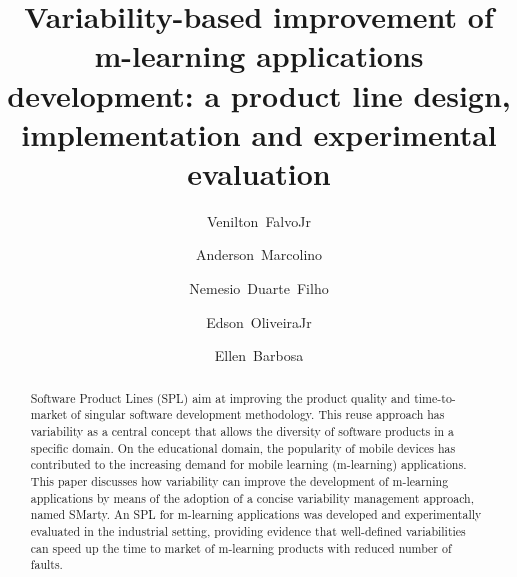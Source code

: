 \documentclass[preprint,12pt]{elsarticle}
\begin{document}
\begin{frontmatter}



\title{Variability-based improvement of m-learning applications development: a product line design, implementation and experimental evaluation}


\author[usp]{Venilton~FalvoJr}
\author[usp]{Anderson~Marcolino}
\author[usp]{Nemesio~Duarte~Filho}
\author[uem]{Edson~OliveiraJr}
\author[usp]{Ellen~Barbosa}


\address[usp]{University of Sao Paulo (USP), Brazil}
\address[uem]{State University of Maringa (UEM), Brazil}

\begin{abstract}
Software Product Lines (SPL) aim at improving the product quality and time-to-market of singular software development methodology. This reuse approach has variability as a central concept that allows the diversity of software products in a specific domain. On the educational domain, the popularity of mobile devices has contributed to the increasing demand for mobile learning (m-learning) applications. This paper discusses how variability can improve the development of m-learning applications by means of the adoption of a concise variability management approach, named SMarty. An SPL for m-learning applications was developed and experimentally evaluated in the industrial setting, providing evidence that well-defined variabilities can speed up the time to market of m-learning products with reduced number of faults.
\end{abstract}


\end{frontmatter}
\end{document}
